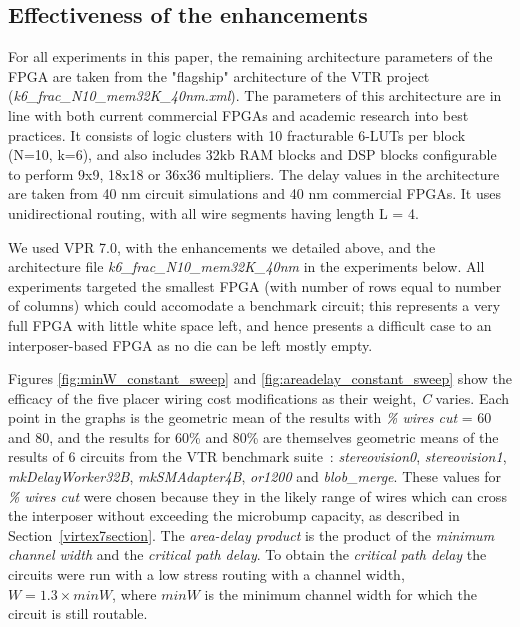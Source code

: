 \documentclass{sig-alternate-2013}
\begin{document}
\subsection{Effectiveness of the enhancements}
\label{sec:CADeffect}
For all experiments in this paper, the remaining architecture parameters of the FPGA are taken from the "flagship" architecture of the VTR project (\textit{k6\_frac\_N10\_mem32K\_40nm.xml}). The parameters of this architecture are in line with both current commercial FPGAs and academic research into best practices. It consists of logic clusters with 10 fracturable 6-LUTs per block (N=10, k=6), and also includes 32kb RAM blocks and DSP blocks configurable to perform 9x9, 18x18 or 36x36 multipliers. The delay values in the architecture are taken from 40 nm circuit simulations and 40 nm commercial FPGAs. It uses unidirectional routing, with all wire segments having length L = 4.

We used VPR 7.0, with the enhancements we detailed above, and the architecture file \textit{k6\_frac\_N10\_mem32K\_40nm} in the experiments below. All experiments targeted the smallest FPGA (with number of rows equal to number of columns) which could accomodate a benchmark circuit; this represents a very full FPGA with little white space left, and hence presents a difficult case to an interposer-based FPGA as no die can be left mostly empty.

Figures \ref{fig:minW_constant_sweep} and \ref{fig:areadelay_constant_sweep} show the efficacy of the five placer wiring cost modifications as their weight, \textit{C} varies. Each point in the graphs is the geometric mean of the results with \textit{\% wires cut} = 60 and 80, and the results for 60\% and 80\% are themselves geometric means of the results of 6 circuits from the VTR benchmark suite~\cite{vtr2012}:  \textit{stereovision0}, \textit{stereovision1}, \textit{mkDelayWorker32B}, \textit{mkSMAdapter4B}, \textit{or1200} and \textit{blob\_merge}. These values for \textit{\% wires cut} were chosen because they in the likely range of wires which can cross the interposer without exceeding the microbump capacity, as described in Section~\ref{virtex7section}. The \textit{area-delay product} is the product of the \textit{minimum channel width} and the \textit{critical path delay}. To obtain the \textit{critical path delay} the circuits were run with a low stress routing with a channel width, $W = 1.3 \times minW$, where $minW$ is the minimum channel width for which the circuit is still routable. 
\end{document}
